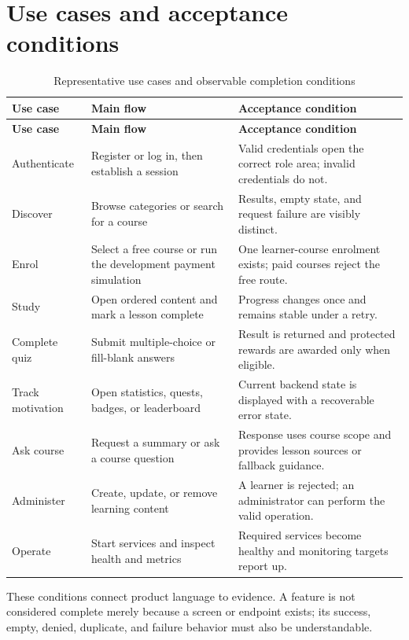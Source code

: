 \documentclass[12pt,a4paper,oneside]{report}
\begin{document}
\section{Use cases and acceptance conditions}
\begin{longtable}{P{0.20\textwidth}P{0.34\textwidth}P{0.35\textwidth}}
\caption{Representative use cases and observable completion conditions}\\\toprule
\textbf{Use case} & \textbf{Main flow} & \textbf{Acceptance condition}\\\midrule\endfirsthead
\toprule\textbf{Use case} & \textbf{Main flow} & \textbf{Acceptance condition}\\\midrule\endhead
Authenticate & Register or log in, then establish a session & Valid credentials open the correct role area; invalid credentials do not.\\
Discover & Browse categories or search for a course & Results, empty state, and request failure are visibly distinct.\\
Enrol & Select a free course or run the development payment simulation & One learner-course enrolment exists; paid courses reject the free route.\\
Study & Open ordered content and mark a lesson complete & Progress changes once and remains stable under a retry.\\
Complete quiz & Submit multiple-choice or fill-blank answers & Result is returned and protected rewards are awarded only when eligible.\\
Track motivation & Open statistics, quests, badges, or leaderboard & Current backend state is displayed with a recoverable error state.\\
Ask course & Request a summary or ask a course question & Response uses course scope and provides lesson sources or fallback guidance.\\
Administer & Create, update, or remove learning content & A learner is rejected; an administrator can perform the valid operation.\\
Operate & Start services and inspect health and metrics & Required services become healthy and monitoring targets report up.\\
\bottomrule
\end{longtable}

These conditions connect product language to evidence. A feature is not considered
complete merely because a screen or endpoint exists; its success, empty, denied,
duplicate, and failure behavior must also be understandable.
\end{document}
